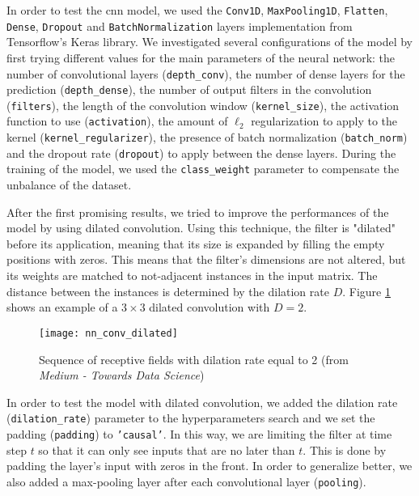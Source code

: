 In order to test the \acs{cnn} model, we used the \texttt{Conv1D}, \texttt{MaxPooling1D}, \texttt{Flatten}, \texttt{Dense}, \texttt{Dropout} and \texttt{BatchNormalization} layers implementation from Tensorflow's Keras library. We investigated several configurations of the model by first trying different values for the main parameters of the neural network: the number of convolutional layers (\texttt{depth\_conv}), the number of dense layers for the prediction (\texttt{depth\_dense}), the number of output filters in the convolution (\texttt{filters}), the length of the convolution window (\texttt{kernel\_size}), the activation function to use (\texttt{activation}), the amount of $\ell_2$ regularization to apply to the kernel (\texttt{kernel\_regularizer}), the presence of batch normalization (\texttt{batch\_norm}) and the dropout rate (\texttt{dropout}) to apply between the dense layers. During the training of the model, we used the \texttt{class\_weight} parameter to compensate the unbalance of the dataset.

After the first promising results, we tried to improve the performances of the model by using dilated convolution. Using this technique, the filter is "dilated" before its application, meaning that its size is expanded by filling the empty positions with zeros. This means that the filter's dimensions are not altered, but its weights are matched to not-adjacent instances in the input matrix. The distance between the instances is determined by the dilation rate $D$. Figure \ref{fig:nn_conv_dilated} shows an example of a $3 \times 3$ dilated convolution with $D=2$.
\begin{figure}[htbp]
    \centering
    \texttt{[image: nn\_conv\_dilated]}
    \caption{Sequence of receptive fields with dilation rate equal to 2 (from \textit{Medium - Towards Data Science})}
    \label{fig:nn_conv_dilated}
\end{figure}

In order to test the model with dilated convolution, we added the dilation rate (\texttt{dilation\_rate}) parameter to the hyperparameters search and we set the padding (\texttt{padding}) to \texttt{'causal'}. In this way, we are limiting the filter at time step $t$ so that it can only see inputs that are no later than $t$. This is done by padding the layer's input with zeros in the front. In order to generalize better, we also added a max-pooling layer after each convolutional layer (\texttt{pooling}).

